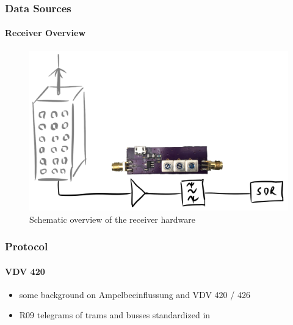 
\begin{frame}
\frametitle{Data Sources}
\framesubtitle{Receiver Overview}
\begin{figure}
\centering
\includegraphics[height=0.65\textheight]{figs/antenna-filter.pdf}
\caption{Schematic overview of the receiver hardware}
\end{figure}
\end{frame}


\begin{frame}
\frametitle{Protocol}
\framesubtitle{VDV 420}
	\begin{itemize}
		\item some background on Ampelbeeinflussung and VDV 420 / 426
		\item R09 telegrams of trams and busses standardized in 
	\end{itemize}
\end{frame}


